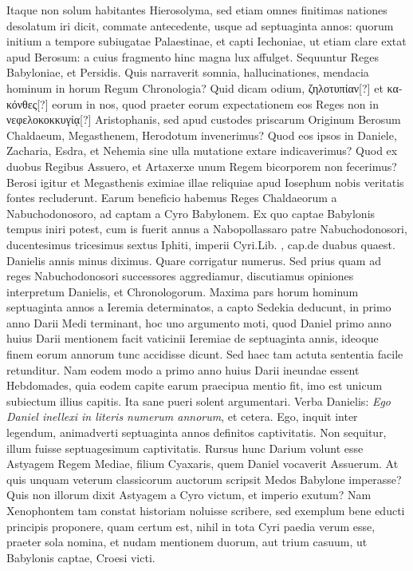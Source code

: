 Itaque non solum
habitantes Hierosolyma, sed etiam omnes finitimas nationes desolatum
iri dicit, commate antecedente, usque ad septuaginta annos:
quorum initium a tempore subiugatae Palaestinae, et capti Iechoniae,
ut etiam clare extat apud Berosum: a cuius fragmento hinc
magna lux affulget.
Sequuntur Reges Babyloniae, et Persidis.
Quis narraverit somnia, hallucinationes, mendacia hominum in horum
Regum Chronologia?
Quid dicam odium, \textgreek{ζηλοτυπίαν[?]} et \textgreek{κακόνθες[?]}
eorum in nos, quod praeter eorum expectationem eos Reges non
in \textgreek{νεφελοκοκκυγίᾳ[?]} Aristophanis, sed apud custodes priscarum Originum
Berosum Chaldaeum, Megasthenem, Herodotum invenerimus?
Quod eos ipsos in Daniele, Zacharia, Esdra, et Nehemia sine
ulla mutatione extare indicaverimus?
Quod ex duobus Regibus
Assuero, et Artaxerxe unum Regem bicorporem non fecerimus?
Berosi igitur et Megasthenis eximiae illae reliquiae apud Iosephum
nobis veritatis fontes recluderunt.
Earum beneficio habemus Reges
Chaldaeorum a Nabuchodonosoro, ad captam a Cyro Babylonem.
Ex quo captae Babylonis tempus iniri potest, cum is fuerit annus
 a Nabopollassaro patre Nabuchodonosori, ducentesimus
tricesimus sextus Iphiti,
  imperii Cyri.Lib. , cap.de duabus
quaest.
Danielis  annis minus diximus.
Quare corrigatur
numerus.
Sed prius quam ad reges Nabuchodonosori successores aggrediamur,
discutiamus opiniones interpretum Danielis, et Chronologorum.
Maxima pars horum hominum septuaginta annos a
Ieremia determinatos, a capto Sedekia deducunt, in primo anno
Darii Medi terminant, hoc uno argumento moti, quod Daniel primo
anno huius Darii mentionem facit vaticinii Ieremiae de septuaginta
annis, ideoque finem eorum annorum tunc accidisse dicunt.
Sed haec tam actuta sententia facile retunditur.
Nam eodem modo
a primo anno huius Darii ineundae essent Hebdomades, quia eodem
capite earum praecipua mentio fit, imo est unicum subiectum illius
capitis.
Ita sane pueri solent argumentari.
Verba Danielis: \textit{Ego
Daniel inellexi in literis numerum annorum}, et cetera.
Ego, inquit inter
legendum, animadverti septuaginta annos definitos captivitatis.
Non sequitur, illum fuisse septuagesimum captivitatis.
Rursus hunc
Darium volunt esse Astyagem Regem Mediae, filium Cyaxaris,
quem Daniel vocaverit Assuerum.
At quis unquam veterum classicorum
auctorum scripsit Medos Babylone imperasse?
Quis non
illorum dixit Astyagem a Cyro victum, et imperio exutum?
Nam Xenophontem tam constat historiam noluisse scribere, sed exemplum
bene educti principis proponere, quam certum est, nihil in tota Cyri
paedia verum esse, praeter sola nomina, et nudam mentionem duorum,
aut trium casuum, ut Babylonis captae, Croesi victi.

